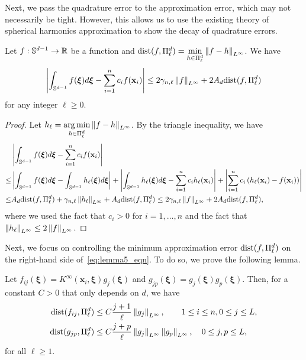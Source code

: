 Next, we pass the quadrature error to the approximation error, which may not necessarily be tight. However, this allows us to use the existing theory of spherical harmonics approximation to show the decay of quadrature errors.
\begin{lem}\label{lem.quadtointerp}
Let $f: {\mathbb{S}}^{d-1} \rightarrow \mathbb{R}$ be a function and $\text{dist}(f,\Pi^d_{\ell}) = \min\limits_{h \in \Pi_\ell^d} \left\lVert f - h\right\rVert_{L^\infty}$. We have
\begin{equation}\label{eq:lemma5_eqn}
    \left|\int_{{\mathbb{S}}^{d-1}} f(\boldsymbol{\xi}) d\boldsymbol{\xi} - \sum_{i=1}^n c_i f(\mathbf{x}_i)\right| \leq 2\gamma_{n,\ell} \left\lVert f\right\rVert_{L^\infty} + 2A_d \text{dist}(f,\Pi^d_{\ell})
\end{equation}
for any integer $\ell \geq 0$.
\end{lem}

\begin{proof}
Let $h_\ell = \operatorname*{arg\,min}\limits_{h \in \Pi_{\ell}^d} \left\lVert f - h\right\rVert_{L^\infty}$. By the triangle inequality, we have
\begin{align*}
    &\left|\int_{{\mathbb{S}}^{d-1}} f(\boldsymbol{\xi}) d\boldsymbol{\xi} - \sum_{i=1}^n c_i f(\mathbf{x}_i)\right| \\
    \leq & \left|\int_{{\mathbb{S}}^{d-1}} f(\boldsymbol{\xi}) d\boldsymbol{\xi} - \int_{{\mathbb{S}}^{d-1}} h_\ell(\boldsymbol{\xi}) d\boldsymbol{\xi}\right| + \left|\int_{{\mathbb{S}}^{d-1}} h_\ell(\boldsymbol{\xi}) d\boldsymbol{\xi} - \sum_{i=1}^n c_i h_\ell(\mathbf{x}_i)\right| + \left|\sum_{i=1}^n c_i \left( h_\ell(\mathbf{x}_i) - f(\mathbf{x}_i)\right)\right| \\
    \leq & A_d \text{dist}(f,\Pi^d_{\ell}) + \gamma_{n,\ell} \left\lVert h_\ell\right\rVert_{L^\infty} + A_d \text{dist}(f,\Pi^d_{\ell}) \leq 2\gamma_{n,\ell} \left\lVert f\right\rVert_{L^\infty} + 2A_d \text{dist}(f,\Pi^d_{\ell}),
\end{align*}
where we used the fact that $c_i > 0$ for $i = 1, \ldots, n$ and the fact that $\left\lVert h_\ell\right\rVert_{L^\infty} \leq 2\left\lVert f\right\rVert_{L^\infty}$. 
\end{proof}

Next, we focus on controlling the minimum approximation error $\text{dist}(f,\Pi^d_{\ell})$ on the right-hand side of~\cref{eq:lemma5_eqn}. To do so, we prove the following lemma.
\begin{lem}\label{lem.interpfg}
Let $f_{ij}(\boldsymbol{\xi}) = {K}^\infty(\mathbf{x}_i, \boldsymbol{\xi}) g_j(\boldsymbol{\xi})$ and $g_{jp}(\boldsymbol{\xi}) = g_j(\boldsymbol{\xi})g_p(\boldsymbol{\xi})$. Then, for a constant $C > 0$ that only depends on $d$, we have
\begin{align*}
    \text{dist}(f_{ij},\Pi^d_{\ell}) & \leq C \frac{j+1}{\ell} \left\lVert g_j\right\rVert_{L^\infty} , \qquad 1 \leq i \leq n, 0 \leq j \leq L, \\
    \text{dist}(g_{jp},\Pi^d_{\ell}) & \leq C \frac{j + p}{\ell}\left\lVert g_j\right\rVert_{L^\infty}\left\lVert g_p\right\rVert_{L^\infty} , \quad 0 \leq j, p \leq L,
\end{align*}
for all $\ell \geq 1$.
\end{lem}

